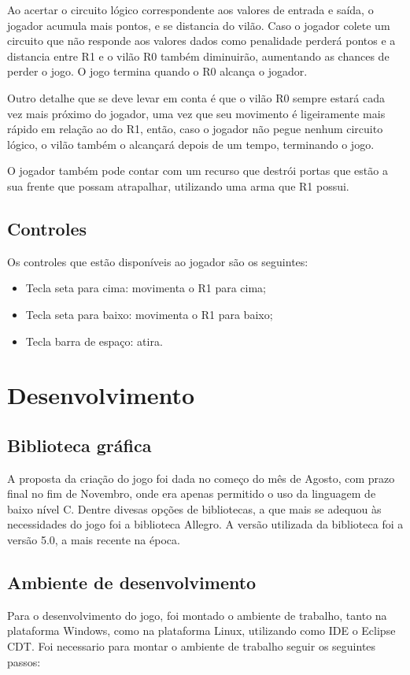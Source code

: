 \documentclass[fncyhd,a4paper]{article}
\begin{document}
	\large Ao acertar o circuito lógico correspondente aos valores de entrada e saída, o jogador acumula mais pontos, e se distancia do vilão. Caso o jogador colete um circuito que 
	não responde aos valores dados como penalidade perderá pontos e a distancia entre R1 e o vilão R0 também diminuirão, aumentando as chances de perder o jogo. O jogo termina
	quando o R0 alcança o jogador. 
	
	\large Outro detalhe que se deve levar em conta é que o vilão R0 sempre estará cada vez mais próximo do jogador, uma vez que seu movimento é ligeiramente mais rápido em relação 
	ao do R1, então, caso o jogador não pegue nenhum circuito lógico, o vilão também o alcançará depois de um tempo, terminando o jogo.
	
	\large O jogador também pode contar com um recurso que destrói portas que estão a sua frente que possam atrapalhar, utilizando uma arma que R1 possui. 
	
	\subsection{\large Controles}
	\large Os controles que estão disponíveis ao jogador são os seguintes:
	\begin{itemize}
		\item Tecla seta para cima: movimenta o R1 para cima;
		\item Tecla seta para baixo: movimenta o R1 para baixo;
		\item Tecla barra de espaço: atira.
	\end{itemize}
	
	
	
	
	\section{\Large Desenvolvimento}
	\subsection {\large Biblioteca gráfica}
	\large A proposta da criação do jogo foi dada no começo do mês de Agosto, com prazo final no fim de Novembro, onde era apenas permitido o uso da linguagem de baixo nível C.
	Dentre divesas opções de bibliotecas, a que mais se adequou às necessidades do jogo foi a biblioteca Allegro. A versão utilizada da biblioteca foi a versão 5.0, a mais
	recente na época.
	
	\subsection {\large Ambiente de desenvolvimento}
	\large Para o desenvolvimento do jogo, foi montado o ambiente de trabalho, tanto na plataforma Windows, como na plataforma Linux, utilizando como IDE o Eclipse CDT. Foi necessario
	para montar o ambiente de trabalho seguir os seguintes passos:
	
\end{document}
